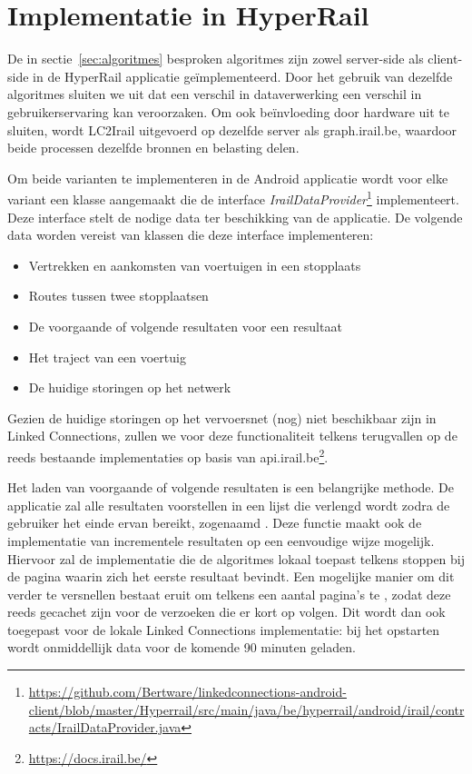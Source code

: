 \section {Implementatie in HyperRail}
De in sectie~\ref{sec:algoritmes} besproken algoritmes zijn zowel server-side als client-side in de HyperRail applicatie geïmplementeerd. Door het gebruik van dezelfde algoritmes sluiten we uit dat een verschil in dataverwerking een verschil in gebruikerservaring kan veroorzaken. Om ook beïnvloeding door hardware uit te sluiten, wordt LC2Irail uitgevoerd op dezelfde server als graph.irail.be, waardoor beide processen dezelfde bronnen en belasting delen.

Om beide varianten te implementeren in de Android applicatie wordt voor elke variant een klasse aangemaakt die de interface \emph{IrailDataProvider}\footnote{\url{https://github.com/Bertware/linkedconnections-android-client/blob/master/Hyperrail/src/main/java/be/hyperrail/android/irail/contracts/IrailDataProvider.java}} implementeert. Deze interface stelt de nodige data ter beschikking van de applicatie. De volgende data worden vereist van klassen die deze interface implementeren:

\begin{itemize}
	\item Vertrekken en aankomsten van voertuigen in een stopplaats
	\item Routes tussen twee stopplaatsen
	\item De voorgaande of volgende resultaten voor een resultaat
	\item Het traject van een voertuig
	\item De huidige storingen op het netwerk
\end{itemize}

Gezien de huidige storingen op het vervoersnet (nog) niet beschikbaar zijn in Linked Connections, zullen we voor deze functionaliteit telkens terugvallen op de reeds bestaande implementaties op basis van api.irail.be\footnote{\url{https://docs.irail.be/}}.

Het laden van voorgaande of volgende resultaten is een belangrijke methode. De applicatie zal alle resultaten voorstellen in een lijst die verlengd wordt zodra de gebruiker het einde ervan bereikt, zogenaamd . Deze functie maakt ook de implementatie van incrementele resultaten op een eenvoudige wijze mogelijk. Hiervoor zal de implementatie die de algoritmes lokaal toepast telkens stoppen bij de pagina waarin zich het eerste resultaat bevindt. Een mogelijke manier om dit verder te versnellen bestaat eruit om telkens een aantal pagina's te , zodat deze reeds gecachet zijn voor de verzoeken die er kort op volgen. Dit wordt dan ook toegepast voor de lokale Linked Connections implementatie: bij het opstarten wordt onmiddellijk data voor de komende 90 minuten geladen.

